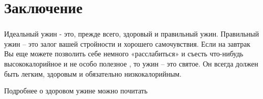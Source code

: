 \documentclass[t,hyperref={pdftex,unicode}]{beamer}  %
\begin{document}
\section{Заключение}

\begin{frame}
	\frametitle{\insertsection}
	Идеальный ужин - это, прежде всего, здоровый и правильный ужин.
	Правильный ужин – это залог вашей стройности и хорошего самочувствия. Если на завтрак Вы еще можете позволить себе немного «расслабиться» и съесть что-нибудь высококалорийное и не особо полезное , то ужин – это святое. Он всегда должен быть легким, здоровым и обязательно низкокалорийным. 
	
	Подробнее о здоровом ужине можно  почитать \href{http://www.diets.ru/article/1093551/}{}
\end{frame}
\end{document}
